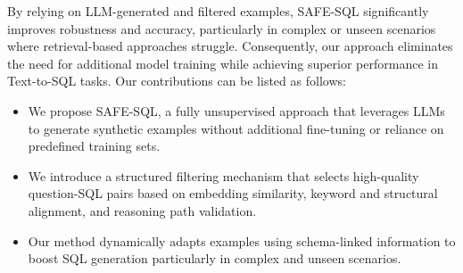By relying on LLM-generated and filtered examples, SAFE-SQL significantly improves robustness and accuracy, particularly in complex or unseen scenarios where retrieval-based approaches struggle. Consequently, our approach eliminates the need for additional model training while achieving superior performance in Text-to-SQL tasks.
Our contributions can be listed as follows:
\begin{itemize}[leftmargin=10pt, labelindent=0pt]
    \item We propose SAFE-SQL, a fully unsupervised approach that leverages LLMs to generate synthetic examples without additional fine-tuning or reliance on predefined training sets.
    \item We introduce a structured filtering mechanism that selects high-quality question-SQL pairs based on embedding similarity, keyword and structural alignment, and reasoning path validation.
    \item Our method dynamically adapts examples using schema-linked information to boost SQL generation particularly in complex and unseen scenarios.
\end{itemize}

